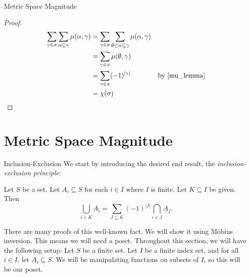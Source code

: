 \documentclass[12pt]{pom_thesis}
\DeclareMathOperator{\ps}{\mathscr{P}}
\begin{document}
\begin{chapter}{Metric Space Magnitude}
\begin{thm}
\end{thm}
\begin{proof}

\begin{align*}
\sum_{\gamma \in \sigma} \sum_{\alpha \subseteq \gamma} \mu(\alpha, \gamma) &= \sum_{\gamma \in \sigma} \sum_{\emptyset \subset \alpha \subseteq \gamma} \mu(\alpha, \gamma)\\
&= \sum_{\gamma \in \sigma} \mu(\emptyset, \gamma)\\
&= \sum_{\gamma \in \sigma} (-1)^{|\gamma|} &\text{by \ref{mu_lemma}}\\
&= \chi(\sigma)
\end{align*}
\end{proof}
\section{Metric Space Magnitude}
\end{chapter}
\begin{chapter}{Inclusion-Exclusion}
We start by introducing the desired end result, the \emph{inclusion-exclusion principle}:
\begin{thm}\label{iep}
Let $S$ be a set. Let $A_i \subseteq S$ for each $i \in I$ where $I$ is finite. Let $K \subseteq I$ be given. Then
\[
\bigcup_{i \in K}A_i = \sum_{J \subseteq K}(-1)^{|J|}\bigcap_{i \in J}A_j
.\]
\end{thm}
There are many proofs of this well-known fact. We will show it using M\"obius inversion. This means we will need a poset. Throughout this section, we will have the following setup: Let $S$ be a finite set. Let $I$ be a finite index set, and for all $i \in I$, let $A_i \subseteq S$. We will be manipulating functions on subsets of $I$, so this will be our poset.




\iffalse
\begin{definition}
Let $S$ be a set. Then the \emph{power set} of $S$, denoted $\ps(S)$, is the set of subsets of $S$, $\{A \subseteq S\}$.
\end{definition}
We will be using the poset whose elements are from $\ps(S)$, where $A \leq B$ if $A \supseteq B$. However, for clarity, we won't use the $\leq$ notation for this poset - we will use inclusion notation directly, and define $\zeta$ and $\mu$ in terms of it. 

Recall that $\zeta$ is the indicator function on a poset. So we define $\zeta: \ps(S) \times \ps(S) \rightarrow \{0,1\}$:
\[
\zeta(A,B) = 
\]
\fi
\end{chapter}



\end{document}
